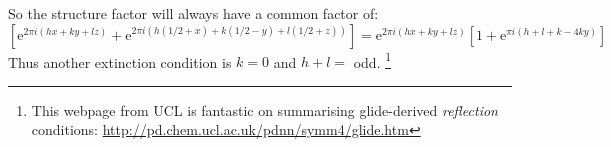 \begin{parts}
	So the structure factor will always have a common factor of:
	\begin{equation*}
		\left[
		 \mathrm{e}^{2\pi i\left(hx+ky+lz\right)} + \mathrm{e}^{2\pi i\left(h(1/2 + x) + k(1/2 - y) +l(1/2 + z)\right)}
		\right]
		= \mathrm{e}^{2\pi i\left(hx+ky+lz\right)}
		\left[
		 1 + \mathrm{e}^{\pi i\left(h+l+k-4ky\right)}
		\right]
	\end{equation*}
	Thus another extinction condition is $k=0$ and $h+l=$ odd.%
	\footnote{This webpage from UCL is fantastic on summarising glide-derived \textit{reflection} conditions: \url{http://pd.chem.ucl.ac.uk/pdnn/symm4/glide.htm}}
\end{parts}